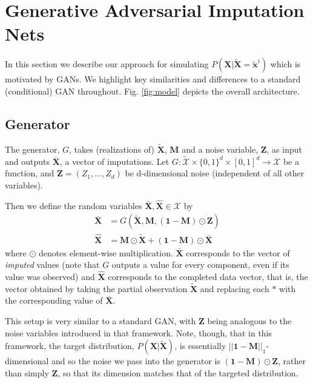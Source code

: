 \documentclass{article}
\begin{document}
\section{Generative Adversarial Imputation Nets}\label{sect:gain}
In this section we describe our approach for simulating $P(\mathbf{X} | \tilde{\mathbf{X}} = \tilde{\mathbf{x}}^i)$ which is motivated by GANs. We highlight key similarities and differences to a standard (conditional) GAN throughout. Fig. \ref{fig:model} depicts the overall architecture.
\subsection{Generator}
The generator, $G$, takes (realizations of) $\tilde{\mathbf{X}}$, $\mathbf{M}$ and a noise variable, $\mathbf{Z}$, as input and outputs $\bar{\mathbf{X}}$, a vector of imputations. Let $G: \tilde{\mathcal{X}} \times \{0, 1\}^d \times [0, 1]^d \to \mathcal{X}$ be a function, and $\mathbf{Z} = (Z_1, ..., Z_d)$ be d-dimensional noise (independent of all other variables).

Then we define the random variables $\bar{\mathbf{X}}, \hat{\mathbf{X}} \in \mathcal{X}$ by
\begin{align} \label{eq:xbar}
\bar{\mathbf{X}} &= G(\tilde{\mathbf{X}}, \mathbf{M}, (\mathbf{1 - M}) \odot \mathbf{Z}) \\ \label{eq:xhat}
\hat{\mathbf{X}} &= \mathbf{M} \odot \tilde{\mathbf{X}} + (\mathbf{1} - \mathbf{M}) \odot \bar{\mathbf{X}}
\end{align}
where $\odot$ denotes element-wise multiplication. $\bar{\mathbf{X}}$ corresponds to the vector of {\em imputed} values (note that $G$ outputs a value for every component, even if its value was observed) and $\hat{\mathbf{X}}$ corresponds to the completed data vector, that is, the vector obtained by taking the partial observation $\tilde{\mathbf{X}}$ and replacing each $*$ with the corresponding value of $\bar{\mathbf{X}}$.

This setup is very similar to a standard GAN, with $\mathbf{Z}$ being analogous to the noise variables introduced in that framework. Note, though, that in this framework, the target distribution, $P(\mathbf{X} | \tilde{\mathbf{X}})$, is essentially $||\mathbf{1 - M}||_1$-dimensional and so the noise we pass into the generator is $(\mathbf{1 - M}) \odot \mathbf{Z}$, rather than simply $\mathbf{Z}$, so that its dimension matches that of the targeted distribution.
\end{document}
